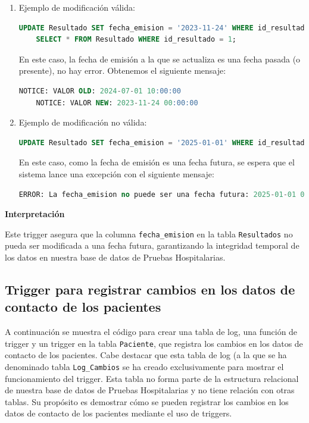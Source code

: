 \documentclass[spanish]{article}
\begin{document}
\begin{enumerate}
    \item Ejemplo de modificación válida:
    
    \begin{lstlisting}[language=SQL] 
    UPDATE Resultado SET fecha_emision = '2023-11-24' WHERE id_resultado = 1;
    SELECT * FROM Resultado WHERE id_resultado = 1;   
    \end{lstlisting}
   
     En este caso, la fecha de emisión a la que se actualiza es una fecha pasada (o presente), no hay error. Obtenemos el siguiente mensaje:

    \begin{lstlisting}[language=SQL]
    NOTICE: VALOR OLD: 2024-07-01 10:00:00
    NOTICE: VALOR NEW: 2023-11-24 00:00:00
    \end{lstlisting}
    
    \item Ejemplo de modificación no válida:
    \begin{lstlisting}[language=SQL] 
    UPDATE Resultado SET fecha_emision = '2025-01-01' WHERE id_resultado = 1; 
    \end{lstlisting}
    En este caso, como la fecha de emisión es una fecha futura, se espera que el sistema lance una excepción con el siguiente mensaje:
    
    \begin{lstlisting}[language=SQL] 
    ERROR: La fecha_emision no puede ser una fecha futura: 2025-01-01 00:00:00
    \end{lstlisting}
    
\end{enumerate}

\textbf{Interpretación}

Este trigger asegura que la columna \texttt{fecha\_emision} en la tabla \texttt{Resultados} no pueda ser modificada a una fecha futura, garantizando la integridad temporal de los datos en nuestra base de datos de Pruebas Hospitalarias.


\subsection{Trigger para registrar cambios en los datos de contacto de los pacientes}

A continuación se muestra el código para crear una tabla de log, una función de trigger y un trigger en la tabla \texttt{Paciente}, que registra los cambios en los datos de contacto de los pacientes. Cabe destacar que esta tabla de log (a la que se ha denominado tabla \texttt{Log\_Cambios} se ha creado exclusivamente para mostrar el funcionamiento del trigger. Esta tabla no forma parte de la estructura relacional de nuestra base de datos de Pruebas Hospitalarias y no tiene relación con otras tablas. Su propósito es demostrar cómo se pueden registrar los cambios en los datos de contacto de los pacientes mediante el uso de triggers.
\end{document}
